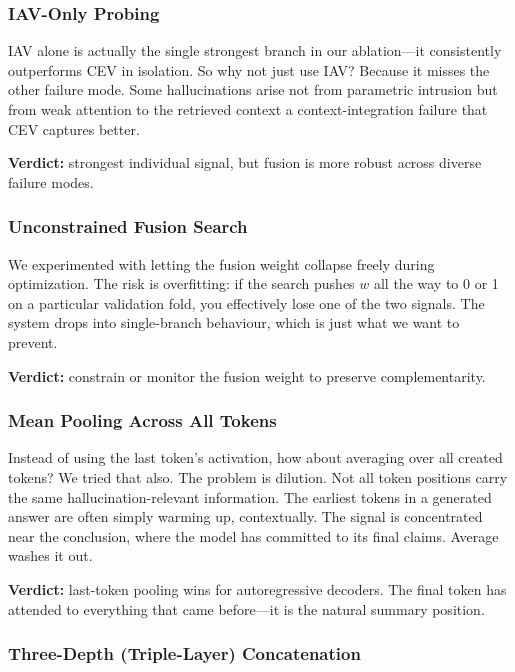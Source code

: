 \subsubsection{IAV-Only Probing}

IAV alone is actually the single strongest branch in our ablation—it consistently outperforms CEV in isolation. So why not just use IAV? Because it misses the other failure mode. Some hallucinations arise not from parametric intrusion but from weak attention to the retrieved context a context-integration failure that CEV captures better.

\textbf{Verdict:} strongest individual signal, but fusion is more robust across diverse failure modes.

\subsubsection{Unconstrained Fusion Search}

We experimented with letting the fusion weight collapse freely during optimization. The risk is overfitting: if the search pushes $w$ all the way to 0 or 1 on a particular validation fold, you effectively lose one of the two signals. The system drops into single-branch behaviour, which is just what we want to prevent.

\textbf{Verdict:} constrain or monitor the fusion weight to preserve complementarity.

\subsubsection{Mean Pooling Across All Tokens}

Instead of using the last token's activation, how about averaging over all created tokens? We tried that also. The problem is dilution.  Not all token positions carry the same hallucination-relevant information. The earliest tokens in a generated answer are often simply warming up, contextually. The signal is concentrated near the conclusion, where the model has committed to its final claims. Average washes it out.

\textbf{Verdict:} last-token pooling wins for autoregressive decoders. The final token has attended to everything that came before—it is the natural summary position.

\subsubsection{Three-Depth (Triple-Layer) Concatenation}

